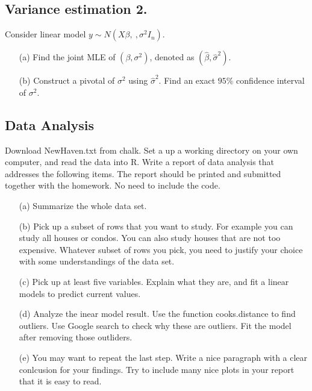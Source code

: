 \documentclass{tufte-book}
\begin{document}
\subsection{Variance estimation 2.} Consider linear model $y \sim N(X\beta,\ , \sigma^2I_n)$.

\begin{enumerate}
\item[(a)] Find the joint MLE of $(\beta, \sigma^2)$, denoted as $(\hat{\beta},\hat{\sigma}^2)$.

\item[(b)] Construct a pivotal of $\sigma^2$ using $\hat{\sigma}^2$.  Find an exact $95\%$ confidence interval of $\sigma^2$.
\end{enumerate}

\subsection{Data Analysis} Download NewHaven.txt from chalk.  Set a up a working directory on your own computer, and read the data into R.  Write a report of data analysis that addresses the following items.  The report should be printed and submitted together with the homework.  No need to include the code.

\begin{enumerate}

\item[(a)] Summarize the whole data set.

\item[(b)] Pick up a subset of rows that you want to study.  For example you can study all houses or condos.  You can also study houses that are not too expensive.  Whatever subset of rows you pick, you need to justify your choice with some understandings of the data set.

\item[(c)] Pick up at least five variables.  Explain what they are, and fit a linear models to predict current values.

\item[(d)] Analyze the inear model result.  Use the function cooks.distance to find outliers.  Use Google search to check why these are outliers. Fit the model after removing those outliders.

\item[(e)] You may want to repeat the last step.   Write a nice paragraph with a clear conlcusion for your findings.  Try to include many nice plots in your report that it is easy to read.

\end{enumerate}
\end{document}
